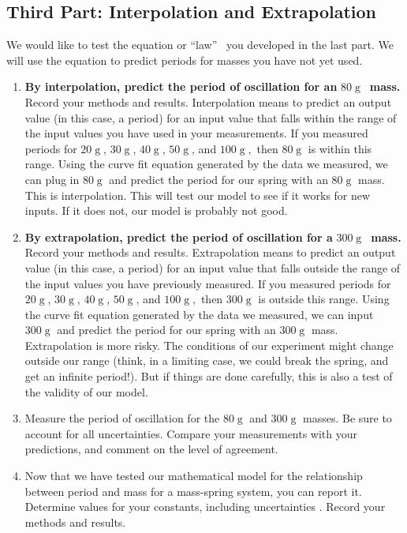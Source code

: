 \documentclass{book}
\begin{document}
\subsection{Third Part: Interpolation and Extrapolation}

We would like to test the equation or \textquotedblleft law\textquotedblright
\ you developed in the last part. We will use the equation to predict periods
for masses you have not yet used.

\begin{enumerate}
\item \textbf{By interpolation, predict the period of oscillation for an }$80
\operatorname{g}
$\textbf{\ mass.} Record your methods and results. Interpolation means to
predict an output value (in this case, a period) for an input value that falls
within the range of the input values you have used in your measurements. If
you measured periods for $20
\operatorname{g}
$, $30
\operatorname{g}
$, $40
\operatorname{g}
$, $50
\operatorname{g}
$, and $100
\operatorname{g}
,$ then $80
\operatorname{g}
$ is within this range. Using the curve fit equation generated by the data we
measured, we can plug in $80
\operatorname{g}
$ and predict the period for our spring with an $80
\operatorname{g}
$ mass. This is interpolation. This will test our model to see if it works for
new inputs. If it does not, our model is probably not good.

\item \textbf{By extrapolation, predict the period of oscillation for a }$300
\operatorname{g}
$\textbf{\ mass.} Record your methods and results. Extrapolation means to
predict an output value (in this case, a period) for an input value that falls
outside the range of the input values you have previously measured. If you
measured periods for $20
\operatorname{g}
$, $30
\operatorname{g}
$, $40
\operatorname{g}
$, $50
\operatorname{g}
$, and $100
\operatorname{g}
,$ then $300
\operatorname{g}
$ is outside this range. Using the curve fit equation generated by the data we
measured, we can input $300
\operatorname{g}
$ and predict the period for our spring with an $300
\operatorname{g}
$ mass. Extrapolation is more risky. The conditions of our experiment might
change outside our range (think, in a limiting case, we could break the
spring, and get an infinite period!). But if things are done carefully, this
is also a test of the validity of our model.

\item Measure the period of oscillation for the $80
\operatorname{g}
$ and $300
\operatorname{g}
$ masses. Be sure to account for all uncertainties. Compare your measurements
with your predictions, and comment on the level of agreement.

\item Now that we have tested our mathematical model for the relationship
between period and mass for a mass-spring system, you can report it. Determine
values for your constants, including uncertainties . Record your methods and results.
\end{enumerate}
\end{document}
